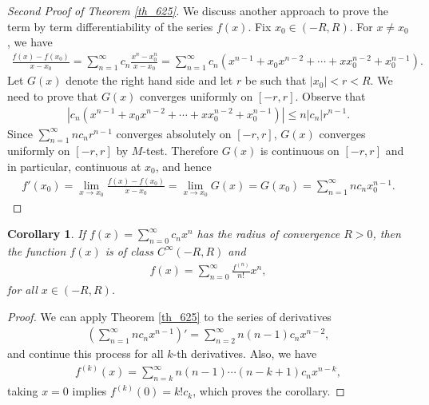 \documentclass[11pt]{book}
\newtheorem{corollary}{Corollary}[theorem]
\theoremstyle{definition}
\numberwithin{equation}{chapter}
\begin{document}
\begin{proof}[Second Proof of Theorem \ref{th_625}]
We discuss another approach to prove the term by term differentiability of the series $f(x)$. Fix $x_0 \in (-R,R)$. For $x \neq x_0$, we have
\begin{align*}
    \frac{f(x) - f(x_0)}{x - x_0} = \sum^\infty_{n=1} c_n \frac{x^n - x_0^n}{x - x_0} = \sum^\infty_{n=1} c_n \left(x^{n-1} + x_0 x^{n-2} + \cdots + x x_0^{n-2} + x_0^{n-1}\right).
\end{align*}
Let $G(x)$ denote the right hand side and let $r$ be such that $\left|x_0\right| < r < R$. We need to prove that $G(x)$ converges uniformly on $[-r,r]$. Observe that
\begin{align*}
    \left|c_n \left(x^{n-1} + x_0 x^{n-2} + \cdots + x x_0^{n-2} + x_0^{n-1}\right)\right| \leq n \left|c_n\right| r^{n-1}.
\end{align*}
Since $\sum^\infty_{n=1} n c_n r^{n-1}$ converges absolutely on $[-r,r]$, $G(x)$ converges uniformly on $[-r,r]$ by $M$-test. Therefore $G(x)$ is continuous on $[-r,r]$ and in particular, continuous at $x_0$, and hence
\begin{align*}
    f'(x_0) = \lim_{x\to x_0} \frac{f(x) - f(x_0)}{x - x_0} = \lim_{x \to x_0} G(x) = G(x_0) = \sum^\infty_{n=1} n c_n x_0^{n-1}.
\end{align*}
\end{proof}

\medskip

\begin{corollary}\label{coro_6251}
If $f(x) = \sum^\infty_{n=0} c_n x^n$ has the radius of convergence $R > 0$, then the function $f(x)$ is of class $C^\infty(-R,R)$ and
\begin{align*}
    f(x) = \sum^\infty_{n=0} \frac{f^{(n)}}{n!} x^n,
\end{align*}
for all $x \in (-R,R)$.
\end{corollary}
\begin{proof}
We can apply Theorem \ref{th_625} to the series of derivatives
\begin{align*}
    \left(\sum^\infty_{n=1} n c_n x^{n-1} \right)' = \sum^\infty_{n=2} n (n-1) c_n x^{n-2},
\end{align*}
and continue this process for all $k$-th derivatives. Also, we have
\begin{align*}
    f^{(k)}(x) = \sum^\infty_{n=k} n (n-1) \cdots (n-k+1) c_n x^{n-k},
\end{align*}
taking $x = 0$ implies $f^{(k)}(0) = k! c_k$, which proves the corollary.
\end{proof}
\end{document}
